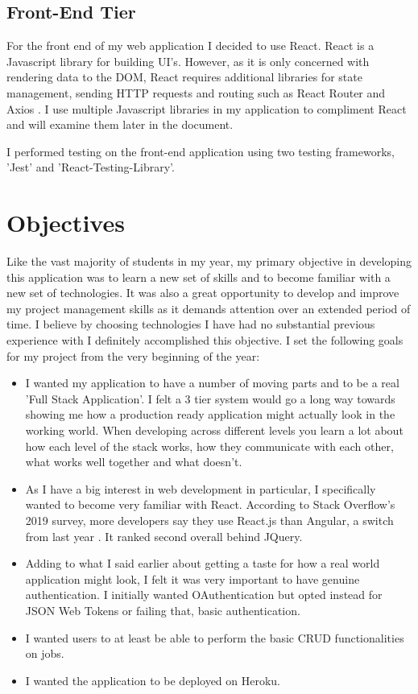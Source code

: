 \subsection{Front-End Tier}
For the front end of my web application I decided to use React. React is a Javascript library for building UI's. However, as it is only concerned with rendering data to the DOM, React requires  additional libraries for state management, sending HTTP requests and routing such as React Router and Axios \cite{wiki:xxx}. I use multiple Javascript libraries in my application to compliment React and will examine them later in the document.

I performed testing on the front-end application using two testing frameworks, 'Jest' and 'React-Testing-Library'.

\section{Objectives}
Like the vast majority of students in my year, my primary objective in developing this application was to learn a new set of skills and to become familiar with a new set of technologies. It was also a great opportunity to develop and improve my project management skills as it demands attention over an extended period of time. I believe by choosing technologies I have had no substantial previous experience with I definitely accomplished this objective. I set the following goals for my project from the very beginning of the year:

\begin{itemize}
    \item I wanted my application to have a number of moving parts and to be a real 'Full Stack Application'. I felt a 3 tier system would go a long way towards showing me how a production ready application might actually look in the working world. When developing across different levels you learn a lot about how each level of the stack works, how they communicate with each other, what works well together and what doesn't.
    \item As I have a big interest in web development in particular, I specifically wanted to become very familiar with React. According to Stack Overflow's 2019 survey, more developers say they use React.js than Angular, a switch from last year \cite{Stack}. It ranked second overall behind JQuery.
    \item Adding to what I said earlier about getting a taste for how a real world application might look, I felt it was very important to have genuine authentication. I initially wanted OAuthentication but opted instead for JSON Web Tokens or failing that, basic authentication.
    \item I wanted users to at least be able to perform the basic CRUD functionalities on jobs.
    \item I wanted the application to be deployed on Heroku.

\end{itemize}

